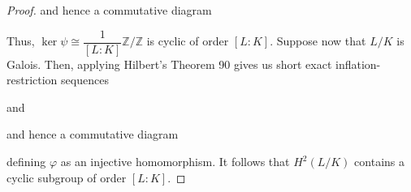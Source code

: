 \documentclass[11pt]{article}
\newcommand{\Q}{\mathbb{Q}}
\newcommand{\Z}{\mathbb{Z}}
\newcommand{\df}{\dfrac}
\newcommand{\iso}{\cong}
\DeclareMathOperator{\Br}{Br} %
\DeclareMathOperator{\Inf}{Inf} %
\DeclareMathOperator{\inv}{inv} %
\DeclareMathOperator{\Res}{Res} %
\DeclareMathOperator{\unr}{unr} %
\renewcommand{\phi}{\varphi}
\begin{document}
\begin{proof}
and hence a commutative diagram
\begin{center}
\end{center}
Thus, $\ker\psi\iso\df{1}{[L:K]}\Z/\Z$ is cyclic of order $[L:K]$. Suppose now that $L/K$ is Galois. Then, applying Hilbert's Theorem 90 gives us short exact inflation-restriction sequences
\begin{center}
\end{center}
and
\begin{center}
\end{center}
and hence a commutative diagram
\begin{center}
\end{center}
defining $\phi$ as an injective homomorphism. It follows that $H^2(L/K)$ contains a cyclic subgroup of order $[L:K]$. 
\end{proof}
\end{document}

